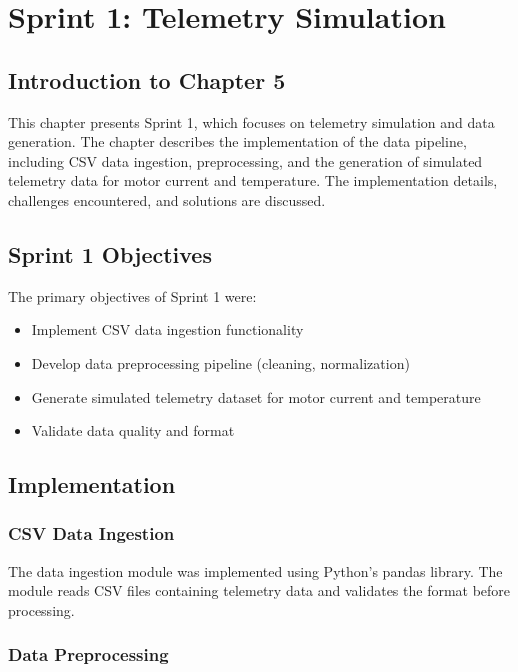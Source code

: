 \chapter{Sprint 1: Telemetry Simulation}

\section*{Introduction to Chapter 5}

This chapter presents Sprint 1, which focuses on telemetry simulation and data generation. The chapter describes the implementation of the data pipeline, including CSV data ingestion, preprocessing, and the generation of simulated telemetry data for motor current and temperature. The implementation details, challenges encountered, and solutions are discussed.

\section{Sprint 1 Objectives}

The primary objectives of Sprint 1 were:
\begin{itemize}
    \item Implement CSV data ingestion functionality
    \item Develop data preprocessing pipeline (cleaning, normalization)
    \item Generate simulated telemetry dataset for motor current and temperature
    \item Validate data quality and format
\end{itemize}

\section{Implementation}

\subsection{CSV Data Ingestion}

The data ingestion module was implemented using Python's pandas library. The module reads CSV files containing telemetry data and validates the format before processing.

\subsection{Data Preprocessing}

